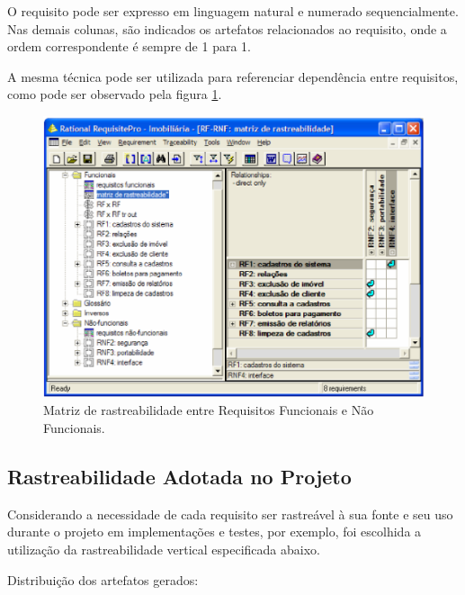 O requisito pode ser expresso em linguagem natural e numerado sequencialmente. Nas demais colunas, são indicados os artefatos relacionados ao requisito, onde a ordem correspondente é sempre de 1 para 1.

A mesma técnica pode ser utilizada para referenciar dependência entre requisitos, como pode ser observado pela figura \ref{matrix_requirement}.

\begin{figure}[htb]
\centering
  \includegraphics[keepaspectratio=true,scale=0.7]
  {figuras/matriz_rastreabilidade2.eps}
  \caption{Matriz de  rastreabilidade  entre  Requisitos  Funcionais  e  Não Funcionais.}
  \label{matrix_requirement}
\end{figure}

\clearpage{}

\subsection{Rastreabilidade Adotada no Projeto}

Considerando a necessidade de cada requisito ser rastreável à sua fonte e seu uso durante o projeto em implementações e testes, por exemplo, foi escolhida a utilização da rastreabilidade vertical especificada abaixo.

Distribuição dos artefatos gerados:

